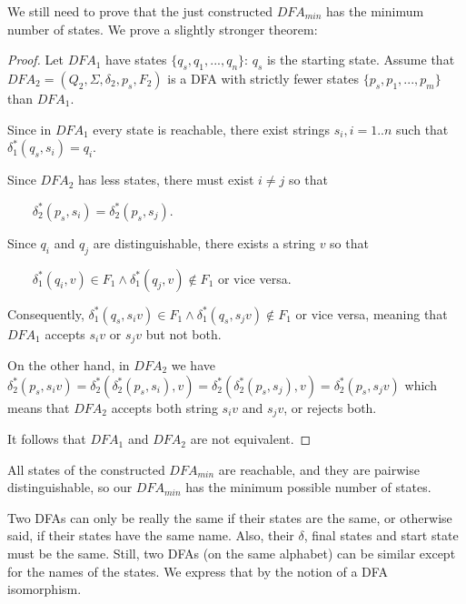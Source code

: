 
We still need to prove that the just constructed $DFA_{min}$ has the
minimum number of states. We prove a slightly stronger theorem:

\begin{proof}
Let $DFA_1$ have states $\{q_s,q_1,...,q_n\}$: $q_s$ is the starting
state. Assume that
%
$DFA_2 = (Q_2,\Sigma,\delta_2,p_s,F_2)$ is a DFA with strictly fewer
states $\{p_s,p_1,...,p_m\}$ than $DFA_1$.

Since in $DFA_1$ every state is reachable, there exist strings $s_i,
i=1..n$ such that
%
$\delta_1^*(q_s,s_i) = q_i$.


Since $DFA_2$ has less states, there must exist $i \neq j$ so that

$~~~~~~~~~\delta_2^*(p_s,s_i) = \delta_2^*(p_s,s_j)$.


Since $q_i$ and $q_j$ are distinguishable, there exists a string $v$
so that


$~~~~~~~~~\delta_1^*(q_i,v) \in F_1 \wedge \delta_1^*(q_j,v) \notin F_1$ or vice versa.

Consequently,
%
$\delta_1^*(q_s,s_iv) \in F_1 \wedge \delta_1^*(q_s,s_jv) \notin F_1$
or vice versa, meaning that $DFA_1$ accepts $s_iv$ or $s_jv$ but not
both.


On the other hand, in $DFA_2$ we have
$\delta_2^*(p_s,s_iv) = \delta_2^*(\delta_2^*(p_s,s_i),v) =
\delta_2^*(\delta_2^*(p_s,s_j),v) = \delta_2^*(p_s,s_jv)$
which means that $DFA_2$ accepts both string $s_iv$ and $s_jv$,
or rejects both.

It follows that $DFA_1$ and $DFA_2$ are not equivalent.
\end{proof}

All states of the constructed $DFA_{min}$ are reachable, and they are
pairwise distinguishable, so our $DFA_{min}$ has the minimum possible
number of states.


Two DFAs can only be really the same if their states are the same, or
otherwise said, if their states have the same name. Also, their
$\delta$, final states and start state must be the same. Still, two
DFAs (on the same alphabet) can be similar except for the names of the
states. We express that by the notion of a DFA isomorphism.

